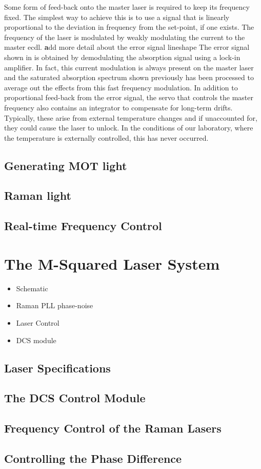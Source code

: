 Some form of feed-back onto the master laser is required to keep its frequency fixed. The simplest way to achieve this is to use a signal that is linearly proportional to the deviation in frequency from the set-point, if one exists. The frequency of the laser is modulated by weakly modulating the current to the master \ac{ecdl}. {\textbf add more detail about the error signal lineshape} The error signal shown in  is obtained by demodulating the absorption signal using a lock-in amplifier. In fact, this current modulation is always present on the master laser and the saturated absorption spectrum shown previously has been processed to average out the effects from this fast frequency modulation. In addition to proportional feed-back from the error signal, the servo that controls the master frequency also contains an integrator to compensate for long-term drifts. Typically, these arise from external temperature changes and if unaccounted for, they could cause the laser to unlock. In the conditions of our laboratory, where the temperature is externally controlled, this has never occurred.  
\subsection{Generating MOT light}
\subsection{Raman light}
\subsection{Real-time Frequency Control}
\section{The M-Squared Laser System}\label{sec:setup_msquared}
\begin{itemize}
    \item Schematic
    \item Raman PLL phase-noise
    \item Laser Control
    \item DCS module
\end{itemize}
\subsection{Laser Specifications}
\subsection{The DCS Control Module}
\subsection{Frequency Control of the Raman Lasers}
\subsection{Controlling the Phase Difference}
